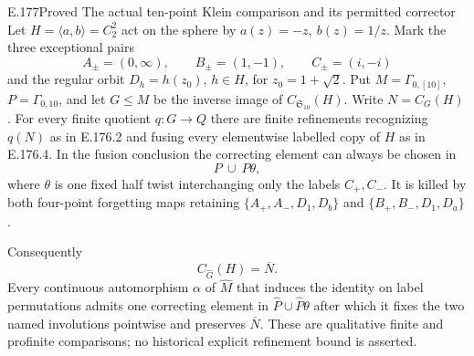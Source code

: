 \begin{result}{E.177}{Proved}
{The actual ten-point Klein comparison and its permitted corrector}
Let \(H=\langle a,b\rangle=C_2^2\) act on the sphere by
\(a(z)=-z,\ b(z)=1/z\).  Mark the three exceptional pairs
\[
 A_\pm=(0,\infty),\qquad B_\pm=(1,-1),\qquad
 C_\pm=(i,-i)
\tag{E.177.1}
\]
and the regular orbit
\(D_h=h(z_0)\), \(h\in H\), for \(z_0=1+\sqrt2\).
Put \(M=\Gamma_{0,[10]}\), \(P=\Gamma_{0,10}\), and let
\(G\leq M\) be the inverse image of
\(C_{\mathfrak S_{10}}(H)\).  Write \(N=C_G(H)\).
For every finite quotient \(q:G\to Q\) there are finite
refinements recognizing \(q(N)\) as in E.176.2 and fusing
every elementwise labelled copy of \(H\) as in E.176.4.
In the fusion conclusion the correcting element can
always be chosen in
\[
                          P\ \cup\ P\theta ,
\tag{E.177.2}
\]
where \(\theta\) is one fixed half twist interchanging
only the labels \(C_+,C_-\).
It is killed by both four-point forgetting maps retaining
\(\{A_+,A_-,D_1,D_b\}\) and
\(\{B_+,B_-,D_1,D_a\}\).

Consequently
\[
              C_{\widehat G}(H)=\overline N .
\tag{E.177.3}
\]
Every continuous automorphism \(\alpha\) of
\(\widehat M\) that induces the identity on label
permutations admits one correcting element in
\(\widehat P\cup\widehat P\theta\) after which it fixes
the two named involutions pointwise and preserves
\(\overline N\).
These are qualitative finite and profinite comparisons;
no historical explicit refinement bound is asserted.
\end{result}

